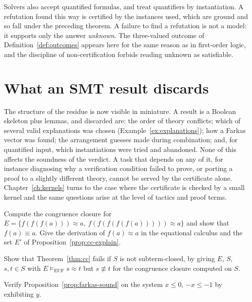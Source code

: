 \begin{remark}
\label{rem:quantifiers}
Solvers also accept quantified formulas, and treat quantifiers by instantiation. A refutation found this way is certified by the instances used, which are ground and so fall under the preceding theorem. A failure to find a refutation is not a model: it supports only the answer \emph{unknown}. The three-valued outcome of Definition~\ref{def:outcomes} appears here for the same reason as in first-order logic, and the discipline of non-certification forbids reading unknown as satisfiable.
\end{remark}

\section{What an SMT result discards}
\label{sec:smt-residue}

The structure of the residue is now visible in miniature. A result is a Boolean skeleton plus lemmas, and discarded are: the order of theory conflicts; which of several valid explanations was chosen (Example~\ref{ex:explanations}); how a Farkas vector was found; the arrangement guesses made during combination; and, for quantified input, which instantiations were tried and abandoned. None of this affects the soundness of the verdict. A task that depends on any of it, for instance diagnosing why a verification condition failed to prove, or porting a proof to a slightly different theory, cannot be served by the certificate alone. Chapter~\ref{ch:kernels} turns to the case where the certificate is checked by a small kernel and the same questions arise at the level of tactics and proof terms.

\begin{exercise}
Compute the congruence closure for $E=\{f(f(f(a)))\approx a,\ f(f(f(f(f(a)))))\approx a\}$ and show that $f(a)\equiv a$. Give the derivation of $f(a)\approx a$ in the equational calculus and the set $E'$ of Proposition~\ref{prop:cc-explain}.
\end{exercise}

\begin{exercise}
Show that Theorem~\ref{thm:cc} fails if $S$ is not subterm-closed, by giving $E$, $S$, $s,t\in S$ with $E\models_{\mathrm{EUF}}s\approx t$ but $s\not\equiv t$ for the congruence closure computed on $S$.
\end{exercise}

\begin{exercise}
Verify Proposition~\ref{prop:farkas-sound} on the system $x\le0$, $-x\le-1$ by exhibiting $y$.
\end{exercise}
